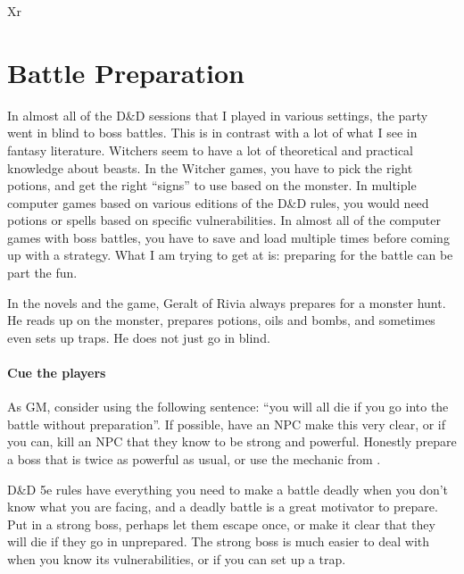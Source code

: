 \documentclass[twocolumn]{dndbook}
\begin{document}
\begin{DndTable}[header=Networking DC]{Xr}
\end{DndTable}


\section{Battle Preparation}
\label{sec:battle_preparation}

In almost all of the D\&D sessions that I played in various settings, the party went in blind to boss battles.
This is in contrast with a lot of what I see in fantasy literature.
Witchers seem to have a lot of theoretical and practical knowledge about beasts.
In the Witcher games, you have to pick the right potions, and get the right ``signs'' to use based on the monster.
In multiple computer games based on various editions of the D\&D rules, you would need potions or spells based on specific vulnerabilities.
In almost all of the computer games with boss battles, you have to save and load multiple times before coming up with a strategy.
What I am trying to get at is: preparing for the battle can be part the fun.\par

\begin{emphasisParagraph}
	In the novels and the game, Geralt of Rivia always prepares for a monster hunt.
	He reads up on the monster, prepares potions, oils and bombs,
	and sometimes even sets up traps.
	He does not just go in blind.
\end{emphasisParagraph}

\paragraph*{Cue the players}
As GM, consider using the following sentence: ``you will all die if you go into the battle without preparation''.
If possible, have an NPC make this very clear, or if you can, kill an NPC that they know to be strong and powerful.
Honestly prepare a boss that is twice as powerful as usual, or use the mechanic from .\par

\begin{emphasisParagraph}
	D\&D 5e rules have everything you need to make a battle deadly when you don't know what you are facing,
	and a deadly battle is a great motivator to prepare.
	Put in a strong boss, perhaps let them escape once, or make it clear that they will die if they go in unprepared.
	The strong boss is much easier to deal with when you know its vulnerabilities,
	or if you can set up a trap.
\end{emphasisParagraph}
\end{document}
